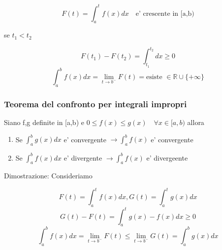 \documentclass{article}
\begin{document}
          \begin{equation*}
            F(t)=\int^t_a f(x)dx \quad \text{e' crescente in [a,b)}
          \end{equation*}
          \begin{flushleft}
            se $t_1<t_2$
          \end{flushleft}
          \begin{equation*}
            F(t_1)-F(t_2)=\int^{t_2}_{t_1}dx \geq 0
          \end{equation*}
          \begin{equation*}
            \int^b_a f(x)dx=\lim_{t \to b^-} F(t)= \text{esiste $\in \mathbb{R} \cup \{+\infty\}$}
          \end{equation*}
          \subsubsection{Teorema del confronto per integrali impropri}
          \begin{flushleft}
            Siano f,g definite in [a,b) e $0\leq f(x)\leq g(x) \quad \forall x\in [a,b)$ allora
          \end{flushleft}
          \begin{enumerate}
            \item Se $\int^b_a g(x)dx$ e' convergente $\to \int^b_a f(x)$ e' convergente
            \item Se $\int^b_a f(x)dx$ e' divergente $\to \int^b_a f(x)$ e' divergeente
          \end{enumerate}
          \begin{flushleft}
            Dimostrazione: Consideriamo
          \end{flushleft}
          \begin{equation*}
            F(t)=\int^t_a f(x)dx,G(t)=\int^t_a g(x)dx
          \end{equation*}
          \begin{equation*}
            G(t)-F(t)=\int^t_a g(x)-f(x)dx \geq 0
          \end{equation*}
          \begin{equation*}
            \int^b_a f(x)dx=\lim_{t \to b^-}F(t) \leq \lim_{t \to b^-}G(t) = \int^b_a g(x)dx
          \end{equation*}
\end{document}
